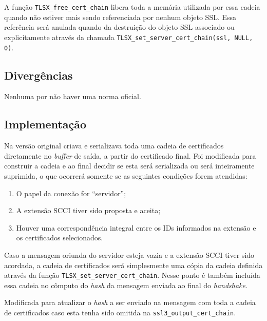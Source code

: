 A função \verb|TLSX_free_cert_chain| libera toda a memória utilizada por essa cadeia 
quando não estiver mais sendo referenciada por nenhum objeto SSL. Essa 
referência será anulada quando da destruição do objeto SSL associado ou 
explicitamente através da chamada \verb|TLSX_set_server_cert_chain(ssl, NULL, 0)|.

\subsection{Divergências}
Nenhuma por não haver uma norma oficial.

\subsection{Implementação}

\begin{description}[\breaklabel\setlabelstyle{\ttfamily}]

\item[s3\_both.c::ssl3\_output\_cert\_chain]
	Na versão original criava e serializava toda uma cadeia de certificados 
	diretamente no \emph{buffer} de saída, a partir do certificado final. Foi 
	modificada para construir a cadeia e ao final decidir se esta será 
	serializada ou será inteiramente suprimida, o que ocorrerá somente se as 
	seguintes condições forem atendidas:
	\begin{enumerate}
	    \item O papel da conexão for ``servidor'';
	    \item A extensão \acl{SCCI} tiver sido proposta e aceita;
	    \item Houver uma correspondência integral entre os IDs informados na
	    extensão e os certificados selecionados.
	\end{enumerate}

\item[s3\_clnt.c::ssl3\_get\_server\_certificate]
	Caso a mensagem \tlsHsC oriunda do servidor esteja vazia e a extensão 
	\acl{SCCI} tiver sido acordada, a cadeia de certificados será 
	simplesmente uma cópia da cadeia definida através da função 
	\verb|TLSX_set_server_cert_chain|. Nesse ponto é também incluída essa cadeia 
	no cômputo do \emph{hash} da mensagem \tlsHsF enviada ao final do \emph{handshake}.

\item[s3\_srvr.c::ssl3\_accept]
	Modificada para atualizar o \emph{hash} a ser enviado na mensagem \tlsHsF com 
	toda a cadeia de certificados caso esta tenha sido omitida na 
	\verb|ssl3_output_cert_chain|.

\end{description}

